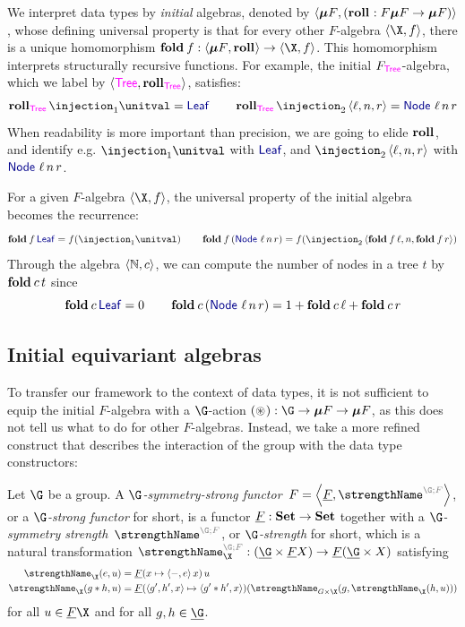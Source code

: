 We interpret data types by \emph{initial} algebras, denoted by
$\pair{\fix F}{(\roll : F \fix F \to \fix F)}$, whose defining
universal property is that for every other $F$-algebra $\pair\X f$,
there is a unique homomorphism $\fold f : \pair{\fix F}{\roll} \to
\pair\X f$. This homomorphism interprets structurally recursive
functions. For example, the initial $\struct[\Tree]$-algebra, which we
label by $\pair{\Tree}{\roll[\Tree]}$, satisfies:
\begin{align*}
  \roll[\Tree] \injection_1\unitval = \Leaf
  \qquad
  \roll[\Tree] \injection_2\triple{\ell}{n}{r} = \Node\,{\ell}\,{n}\,{r}
\end{align*}
When readability is more important than precision, we are going
to elide $\roll$, and identify e.g. $\injection_1\unitval$ with
$\Leaf$, and $\injection_2\triple{\ell}{n}{r}$ with
$\Node\,{\ell}\,{n}\,{r}$.

For a given $F$-algebra $\pair\X f$, the universal property of the
initial algebra becomes the recurrence:
\[
  \fold f\, \Leaf = f(\injection_1\unitval)
  \qquad
  \fold f\, (\Node\,{\ell}\,{n}\,{r}) = f(\injection_2\triple{\fold f\,\ell}n{\fold f\,r})
\]
Through the algebra $\left<{\mathbb{N}}, {c}\right>$, we can compute the number of nodes in a tree $t$ by $\fold c\, t$ since
\[
  \fold c\, \Leaf = 0
  \qquad
  \fold c\, (\Node\,{\ell}\,{n}\,{r}) = 1 + \fold c\, \ell + \fold c\, r
\]

\subsection{Initial equivariant algebras}

To transfer our framework to the context of data types, it is not
sufficient to equip the initial $F$-algebra with a $\G$-action $(\act)
: \G \to \fix F \to \fix F$, as this does not tell us what to do for
other $F$-algebras. Instead, we take a more refined construct that
describes the interaction of the group with the data type
constructors:

\begin{definition}
  Let $\G$ be a group. A \emph{$\G$-symmetry-strong functor}~$F =
  \pair{\carrier F}{\gstrength[\G][F]}$, or a \emph{$\G$-strong
  functor} for short, is a functor $\underline{F} : {\mathbf{ Set}} \to {\mathbf{ Set}}$
  together with a \emph{$\G$-symmetry strength}~$\gstrength[\G][F]$,
  or \emph{$\G$-strength} for short, which is a natural transformation
  \(
    \gstrength[\G][F]_{\X} : (\carrier\G \times \carrier F X) \to \carrier F(\carrier\G \times X)
  \)
  satisfying
  \begin{align*}
    \gstrength_{\X}(\unit, u) &= \carrier F(\fun x\pair-{\unit}x)\, u \\
    \gstrength_{\X}(g\mul h, u) &=
    \carrier F (\fun{\triple{g'}{h'}{x}}\pair{g'\mul h'}x)
    (\gstrength_{G\times\X}(g,
    \gstrength_{\X}(h, u)))
  \end{align*}
  for all $u \in \carrier F\X$ and for all $g,h \in \carrier\G$.
\end{definition}

